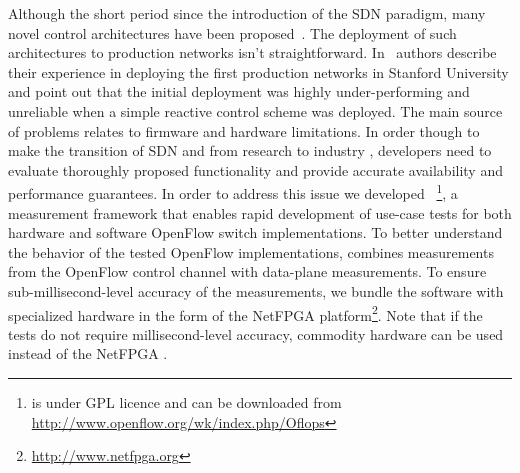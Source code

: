Although the short period since the introduction of the SDN paradigm, many novel
control architectures have been
proposed~\cite{plug_n_serv,difane,flowvisor-osdi}. The deployment of such
architectures to production networks isn't straightforward. 
In~\cite{Weissmann:va} authors describe their experience
in deploying the first \of production networks in Stanford University and point
out that the initial deployment was highly under-performing and unreliable when
a simple reactive control scheme was deployed. The main source of problems
relates to firmware and hardware limitations. In order though to make the
transition of SDN and \of from research to industry ,  developers need to
evaluate thoroughly proposed functionality and provide accurate availability and
performance guarantees. In order to address this issue we developed
\oflops~\footnote{\oflops is under GPL licence and can be downloaded from
  \url{http://www.openflow.org/wk/index.php/Oflops}}, a measurement framework
that enables rapid development of use-case tests for both hardware and software
OpenFlow switch implementations. To better understand the behavior of the tested
OpenFlow implementations, \oflops combines measurements from the OpenFlow
control channel with data-plane measurements. To ensure sub-millisecond-level
accuracy of the measurements, we bundle the \oflops software with specialized
hardware in the form of the NetFPGA
platform\footnote{\url{http://www.netfpga.org}}.  Note that if the tests do not
require millisecond-level accuracy, commodity hardware can be used instead of
the NetFPGA \cite{pam-accuracy}.




